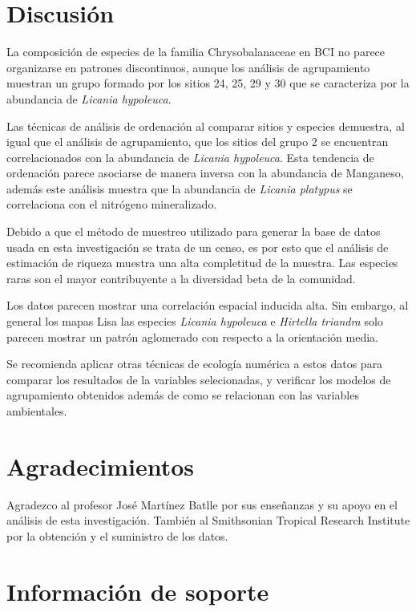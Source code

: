 \documentclass[11pt,]{article}
\begin{document}
\section{Discusión}\label{discusiuxf3n}

La composición de especies de la familia Chrysobalanaceae en BCI no
parece organizarse en patrones discontinuos, aunque los análisis de
agrupamiento muestran un grupo formado por los sitios 24, 25, 29 y 30
que se caracteriza por la abundancia de \emph{Licania hypoleuca}.

Las técnicas de análisis de ordenación al comparar sitios y especies
demuestra, al igual que el análisis de agrupamiento, que los sitios del
grupo 2 se encuentran correlacionados con la abundancia de \emph{Licania
hypoleuca}. Esta tendencia de ordenación parece asociarse de manera
inversa con la abundancia de Manganeso, además este análisis muestra que
la abundancia de \emph{Licania platypus} se correlaciona con el
nitrógeno mineralizado.

Debido a que el método de muestreo utilizado para generar la base de
datos usada en esta investigación se trata de un censo, es por esto que
el análisis de estimación de riqueza muestra una alta completitud de la
muestra. Las especies raras son el mayor contribuyente a la diversidad
beta de la comunidad.

Los datos parecen mostrar una correlación espacial inducida alta. Sin
embargo, al general los mapas Lisa las especies \emph{Licania hypoleuca}
e \emph{Hirtella triandra} solo parecen mostrar un patrón aglomerado con
respecto a la orientación media.

Se recomienda aplicar otras técnicas de ecología numérica a estos datos
para comparar los resultados de la variables selecionadas, y verificar
los modelos de agrupamiento obtenidos además de como se relacionan con
las variables ambientales.

\section{Agradecimientos}\label{agradecimientos}

Agradezco al profesor José Martínez Batlle por sus enseñanzas y su apoyo
en el análisis de esta investigación. También al Smithsonian Tropical
Research Institute por la obtención y el suministro de los datos.

\section{Información de soporte}\label{informaciuxf3n-de-soporte}
\end{document}
